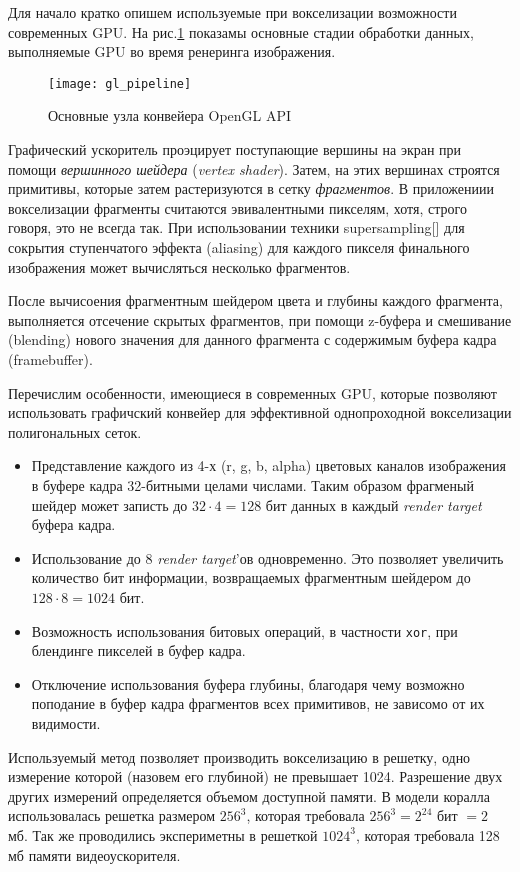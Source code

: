 Для начало кратко опишем используемые при вокселизации возможности современных GPU. На рис.\ref{fig:gl_pipeline} показамы основные стадии обработки данных, выполняемые GPU во время ренеринга изображения.

\begin{figure}[h]
\center
\texttt{[image: gl\_pipeline]}
\caption{Основные узла конвейера OpenGL API}
\label{fig:gl_pipeline}
\end{figure}

Графический ускоритель проэцирует поступающие вершины на экран при помощи \emph{вершинного шейдера} (\emph{vertex shader}). Затем, на этих вершинах строятся примитивы, которые затем растеризуются в сетку \emph{фрагментов}. В приложениии вокселизации фрагменты считаются эвивалентными пикселям, хотя, строго говоря, это не всегда так. При использовании техники supersampling[] для сокрытия ступенчатого эффекта (aliasing) для каждого пикселя финального изображения может вычисляться несколько фрагментов.

После вычисоения фрагментным шейдером цвета и глубины каждого фрагмента, выполняется отсечение скрытых фрагментов, при помощи z-буфера и смешивание (blending) нового значения для данного фрагмента с содержимым буфера кадра (framebuffer).

Перечислим особенности, имеющиеся в современных GPU, которые позволяют использовать графичский конвейер для эффективной однопроходной вокселизации полигональных сеток.

\begin{itemize}
\item Представление каждого из 4-х (r, g, b, alpha) цветовых каналов изображения в буфере кадра 32-битными целами числами. Таким образом фрагменый шейдер может записть до $32 \cdot 4 = 128$ бит данных в каждый \emph{render target} буфера кадра.
\item Использование до 8 \emph{render target}'ов одновременно. Это позволяет увеличить количество бит информации, возвращаемых фрагментным шейдером до $128 \cdot 8 = 1024$ бит.
\item Возможность использования битовых операций, в частности \texttt{xor}, при блендинге пикселей в буфер кадра.
\item Отключение использования буфера глубины, благодаря чему возможно поподание в буфер кадра фрагментов всех примитивов, не зависомо от их видимости.
\end{itemize}

Используемый метод позволяет производить вокселизацию в решетку, одно измерение которой (назовем его глубиной) не превышает 1024. Разрешение двух других измерений определяется объемом доступной памяти. В модели коралла использовалась решетка размером $256^3$, которая требовала $256^3 = 2^{24}$ бит $ = 2$ мб. Так же проводились экспериметны в решеткой $1024^3$, которая требовала 128 мб памяти видеоускорителя.

